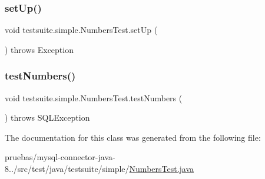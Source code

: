 \subsubsection{\texorpdfstring{set\+Up()}{setUp()}}
{\footnotesize\ttfamily void testsuite.\+simple.\+Numbers\+Test.\+set\+Up (\begin{DoxyParamCaption}{ }\end{DoxyParamCaption}) throws Exception}

\mbox{\label{classtestsuite_1_1simple_1_1_numbers_test_aecceecbd6a68dcd409c3553f1a0e210e}} 
\subsubsection{\texorpdfstring{test\+Numbers()}{testNumbers()}}
{\footnotesize\ttfamily void testsuite.\+simple.\+Numbers\+Test.\+test\+Numbers (\begin{DoxyParamCaption}{ }\end{DoxyParamCaption}) throws S\+Q\+L\+Exception}



The documentation for this class was generated from the following file\+:\begin{DoxyCompactItemize}
\item 
pruebas/mysql-\/connector-\/java-\/8../src/test/java/testsuite/simple/\mbox{\hyperlink{_numbers_test_8java}{Numbers\+Test.\+java}}\end{DoxyCompactItemize}
